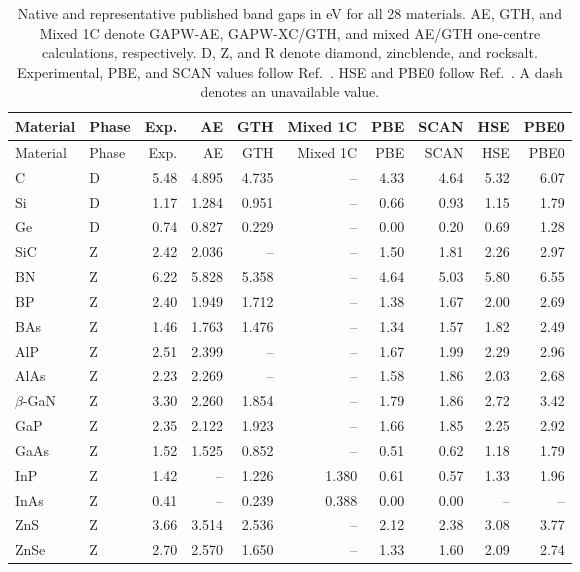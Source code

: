 \documentclass[10pt,a4paper]{article}
\begin{document}
\begingroup\small\setlength{\tabcolsep}{3pt}
\begin{longtable}{llrrrrrrrr}
\caption{Native and representative published band gaps in eV for all 28 materials. AE, GTH, and Mixed 1C denote GAPW-AE, GAPW-XC/GTH, and mixed AE/GTH one-centre calculations, respectively. D, Z, and R denote diamond, zincblende, and rocksalt. Experimental, PBE, and SCAN values follow Ref.~. HSE and PBE0 follow Ref.~. A dash denotes an unavailable value.}\label{tab:bandgap-outcomes}\\
\toprule
Material & Phase & Exp. & AE & GTH & Mixed 1C & PBE & SCAN & HSE & PBE0 \\
\midrule
\endfirsthead
\toprule
Material & Phase & Exp. & AE & GTH & Mixed 1C & PBE & SCAN & HSE & PBE0 \\
\midrule
\endhead
\bottomrule
\endfoot
C & D & 5.48 & 4.895 & 4.735 & -- & 4.33 & 4.64 & 5.32 & 6.07 \\
Si & D & 1.17 & 1.284 & 0.951 & -- & 0.66 & 0.93 & 1.15 & 1.79 \\
Ge & D & 0.74 & 0.827 & 0.229 & -- & 0.00 & 0.20 & 0.69 & 1.28 \\
SiC & Z & 2.42 & 2.036 & -- & -- & 1.50 & 1.81 & 2.26 & 2.97 \\
BN & Z & 6.22 & 5.828 & 5.358 & -- & 4.64 & 5.03 & 5.80 & 6.55 \\
BP & Z & 2.40 & 1.949 & 1.712 & -- & 1.38 & 1.67 & 2.00 & 2.69 \\
BAs & Z & 1.46 & 1.763 & 1.476 & -- & 1.34 & 1.57 & 1.82 & 2.49 \\
AlP & Z & 2.51 & 2.399 & -- & -- & 1.67 & 1.99 & 2.29 & 2.96 \\
AlAs & Z & 2.23 & 2.269 & -- & -- & 1.58 & 1.86 & 2.03 & 2.68 \\
$\beta$-GaN & Z & 3.30 & 2.260 & 1.854 & -- & 1.79 & 1.86 & 2.72 & 3.42 \\
GaP & Z & 2.35 & 2.122 & 1.923 & -- & 1.66 & 1.85 & 2.25 & 2.92 \\
GaAs & Z & 1.52 & 1.525 & 0.852 & -- & 0.51 & 0.62 & 1.18 & 1.79 \\
InP & Z & 1.42 & -- & 1.226 & 1.380 & 0.61 & 0.57 & 1.33 & 1.96 \\
InAs & Z & 0.41 & -- & 0.239 & 0.388 & 0.00 & 0.00 & -- & -- \\
ZnS & Z & 3.66 & 3.514 & 2.536 & -- & 2.12 & 2.38 & 3.08 & 3.77 \\
ZnSe & Z & 2.70 & 2.570 & 1.650 & -- & 1.33 & 1.60 & 2.09 & 2.74 \\

\end{longtable}
\end{document}
